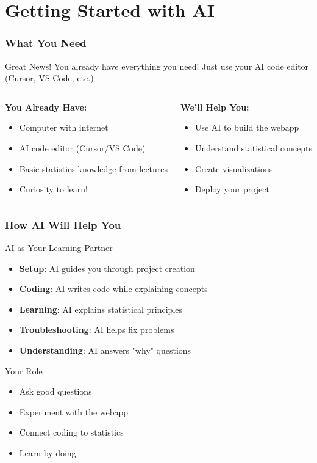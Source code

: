 \documentclass[aspectratio=169]{beamer}
\begin{document}
\section{Getting Started with AI}

\begin{frame}
\frametitle{What You Need}
\begin{alertblock}{Great News!}
You already have everything you need! Just use your AI code editor (Cursor, VS Code, etc.)
\end{alertblock}

\begin{columns}
\begin{column}{0.5\textwidth}
\textbf{You Already Have:}
\begin{itemize}
\item Computer with internet
\item AI code editor (Cursor/VS Code)
\item Basic statistics knowledge from lectures
\item Curiosity to learn!
\end{itemize}
\end{column}
\begin{column}{0.5\textwidth}
\textbf{We'll Help You:}
\begin{itemize}
\item Use AI to build the webapp
\item Understand statistical concepts
\item Create visualizations
\item Deploy your project
\end{itemize}
\end{column}
\end{columns}
\end{frame}

\begin{frame}
\frametitle{How AI Will Help You}
\begin{exampleblock}{AI as Your Learning Partner}
\begin{itemize}
\item \textbf{Setup}: AI guides you through project creation
\item \textbf{Coding}: AI writes code while explaining concepts
\item \textbf{Learning}: AI explains statistical principles
\item \textbf{Troubleshooting}: AI helps fix problems
\item \textbf{Understanding}: AI answers "why" questions
\end{itemize}
\end{exampleblock}

\begin{alertblock}{Your Role}
\begin{itemize}
\item Ask good questions
\item Experiment with the webapp
\item Connect coding to statistics
\item Learn by doing
\end{itemize}
\end{alertblock}
\end{frame}
\end{document}
